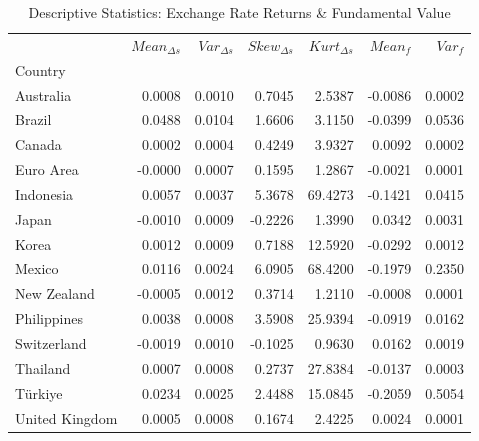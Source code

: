 \begin{table}
\caption{Descriptive Statistics: Exchange Rate Returns & Fundamental Value}
\label{tab:desc_stats}
\begin{tabular}{lrrrrrr}
\toprule
 & $Mean_{\Delta s}$ & $Var_{\Delta s}$ & $Skew_{\Delta s}$ & $Kurt_{\Delta s}$ & $Mean_{f}$ & $Var_{f}$ \\
Country &  &  &  &  &  &  \\
\midrule
Australia & 0.0008 & 0.0010 & 0.7045 & 2.5387 & -0.0086 & 0.0002 \\
Brazil & 0.0488 & 0.0104 & 1.6606 & 3.1150 & -0.0399 & 0.0536 \\
Canada & 0.0002 & 0.0004 & 0.4249 & 3.9327 & 0.0092 & 0.0002 \\
Euro Area & -0.0000 & 0.0007 & 0.1595 & 1.2867 & -0.0021 & 0.0001 \\
Indonesia & 0.0057 & 0.0037 & 5.3678 & 69.4273 & -0.1421 & 0.0415 \\
Japan & -0.0010 & 0.0009 & -0.2226 & 1.3990 & 0.0342 & 0.0031 \\
Korea & 0.0012 & 0.0009 & 0.7188 & 12.5920 & -0.0292 & 0.0012 \\
Mexico & 0.0116 & 0.0024 & 6.0905 & 68.4200 & -0.1979 & 0.2350 \\
New Zealand & -0.0005 & 0.0012 & 0.3714 & 1.2110 & -0.0008 & 0.0001 \\
Philippines & 0.0038 & 0.0008 & 3.5908 & 25.9394 & -0.0919 & 0.0162 \\
Switzerland & -0.0019 & 0.0010 & -0.1025 & 0.9630 & 0.0162 & 0.0019 \\
Thailand & 0.0007 & 0.0008 & 0.2737 & 27.8384 & -0.0137 & 0.0003 \\
Türkiye & 0.0234 & 0.0025 & 2.4488 & 15.0845 & -0.2059 & 0.5054 \\
United Kingdom & 0.0005 & 0.0008 & 0.1674 & 2.4225 & 0.0024 & 0.0001 \\
\bottomrule
\end{tabular}
\end{table}
